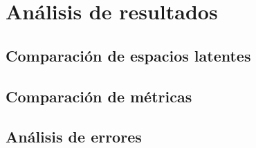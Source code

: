 \chapter{An\'alisis de resultados}

\label{Chapter4}

\section{Comparaci\'on de espacios latentes}

\lipsum[1]

\section{Comparaci\'on de m\'etricas}

\lipsum[1]

\section{An\'alisis de errores}

\lipsum[1]
